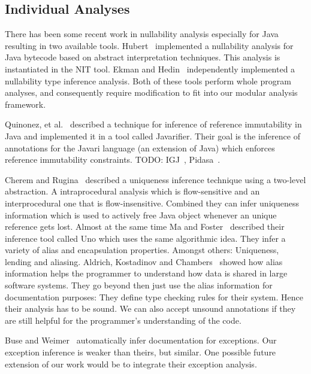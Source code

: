 \subsection{Individual Analyses}

There has been some recent work in nullability analysis especially for Java
resulting in two available tools.  Hubert~\cite{NIT} implemented a nullability
analysis for Java bytecode based on abstract interpretation techniques.  This
analysis is instantiated in the {\sc NIT} tool.  Ekman and
Hedin~\cite{NonNullTypeInference} independently implemented a nullability type
inference analysis.  Both of these tools perform whole program analyses, and
consequently require modification to fit into our modular analysis framework.

Quinonez, et al.~\cite{Javarifier} described a technique for inference of
reference immutability in Java and implemented it in a tool called {\sc
  Javarifier}. Their goal is the inference of annotations for the {\sc Javari}
language (an extension of Java) which enforces reference immutability
constraints. TODO: IGJ~\cite{IGJ}, Pidasa~\cite{Pidasa}.

Cherem and Rugina~\cite{UniquenessInference} described a uniqueness inference
technique using a two-level abstraction. A intraprocedural analysis which is
flow-sensitive and an interprocedural one that is flow-insensitive. Combined
they can infer uniqueness information which is used to actively free Java
object whenever an unique reference gets lost.  Almost at the same time Ma and
Foster~\cite{Uno} described their inference tool called Uno which uses the same
algorithmic idea. They infer a variety of alias and encapsulation
properties. Amongst others: Uniqueness, lending and aliasing.  Aldrich,
Kostadinov and Chambers~\cite{AliasJava} showed how alias information helps the
programmer to understand how data is shared in large software systems.
They go beyond then just use the alias information for documentation purposes:
They define type checking rules for their system. Hence their analysis has to be
sound. We can also accept unsound annotations if they are still helpful for the 
programmer's understanding of the code.

Buse and Weimer~\cite{autodoc} automatically infer documentation for
exceptions.  Our exception inference is weaker than theirs, but similar.  One
possible future extension of our work would be to integrate their exception
analysis.
